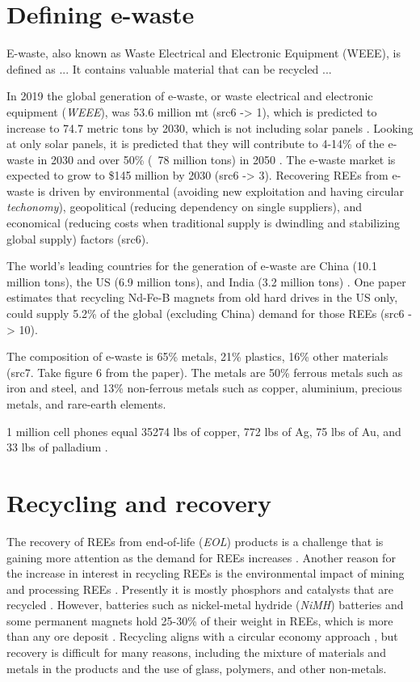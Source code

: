 
\section{Defining e-waste}

E-waste, also known as Waste Electrical and Electronic Equipment (WEEE), is defined as ... 
It contains valuable material that can be recycled ...

In 2019 the global generation of e-waste, or waste electrical and electronic equipment (\textit{WEEE}), was 53.6 million mt (src6 -> 1), which is predicted to increase to 74.7 metric tons by 2030, which is not including solar panels \cite{javed2024}. Looking at only solar panels, it is predicted that they will contribute to 4-14\% of the e-waste in 2030 and over 50\% (~78 million tons) in 2050 \cite{javed2024}. The e-waste market is expected to grow to \$145 million by 2030 (src6 -> 3). Recovering REEs from e-waste is driven by environmental (avoiding new exploitation and having circular \textit{techonomy}), geopolitical (reducing dependency on single suppliers), and economical (reducing costs when traditional supply is dwindling and stabilizing global supply) factors (src6).

The world's leading countries for the generation of e-waste are China (10.1 million tons), the US (6.9 million tons), and India (3.2 million tons) \cite{javed2024}. One paper estimates that recycling Nd-Fe-B magnets from old hard drives in the US only, could supply 5.2\% of the global (excluding China) demand for those REEs (src6 -> 10).

The composition of e-waste is 65\% metals, 21\% plastics, 16\% other materials (src7. Take figure 6 from the paper). The metals are 50\% ferrous metals such as iron and steel, and 13\% non-ferrous metals such as copper, aluminium, precious metals, and rare-earth elements. 

1 million cell phones equal 35274 lbs of copper, 772 lbs of Ag, 75 lbs of Au, and 33 lbs of palladium \cite{javed2024}.

\section{Recycling and recovery}

The recovery of REEs from end-of-life (\textit{EOL}) products is a challenge that is gaining more attention as the demand for REEs increases \cite{USDoE2024}. Another reason for the increase in interest in recycling REEs is the environmental impact of mining and processing REEs \cite{USDoE2024}. Presently it is mostly phosphors and catalysts that are recycled \cite{britannica2024}. However, batteries such as nickel-metal hydride (\textit{NiMH}) batteries and some permanent magnets hold 25-30\% of their weight in REEs, which is more than any ore deposit \cite{britannica2024}. Recycling aligns with a circular economy approach \cite{circular2016}, but recovery is difficult for many reasons, including the mixture of materials and metals in the products and the use of glass, polymers, and other non-metals.

